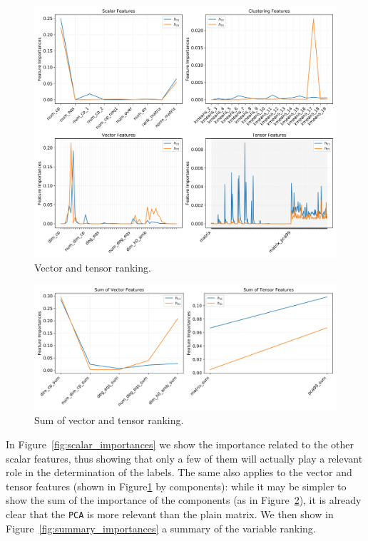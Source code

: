     \begin{figure}[!t]
        \centering
        \includegraphics[width=\textwidth,
                         trim={0 0 0 5in},
                         clip
                        ]{tex/img/feature_importances.png}
        \caption{Vector and tensor ranking.}
        \label{fig:vector_tensor_importances}
    \end{figure}
    
    \begin{figure}[!t]
        \centering
        \includegraphics[width=\textwidth]{tex/img/feature_importances_vector_tensor_sum.png}
        \caption{Sum of vector and tensor ranking.}
        \label{fig:vector_tensor_sum_importances}
    \end{figure}
    
    In Figure~\ref{fig:scalar_importances} we show the importance related to the other scalar features, thus showing that only a few of them will actually play a relevant role in the determination of the labels. The same also applies to the vector and tensor features (shown in Figure\ref{fig:vector_tensor_importances} by components): while it may be simpler to show the sum of the importance of the components (as in Figure~\ref{fig:vector_tensor_sum_importances}), it is already clear that the \texttt{PCA} is more relevant than the plain matrix. We then show in Figure~\ref{fig:summary_importances} a summary of the variable ranking.
    
